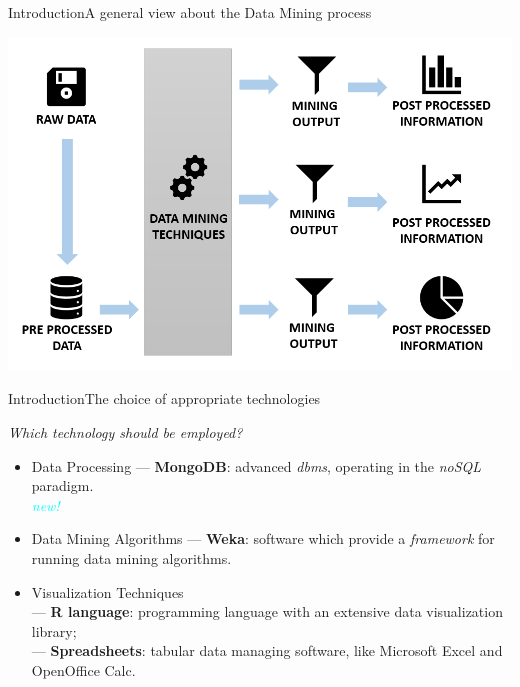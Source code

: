 \begin{frame}{Introduction}{A general view about the Data Mining process}
	\noindent\begin{centering}
		\vspace{-2mm}\hspace{-5mm}\includegraphics[scale=0.33]{img1_noback.png}
	\end{centering}
\end{frame}

\begin{frame}{Introduction}{The choice of appropriate technologies}

	\centering\textit{Which technology should be employed?} \vspace{0,3cm}

	\begin{block}{}
	    \begin{itemize}
		    \item<1-> \alert{Data Processing} --- \textbf{MongoDB}: advanced \emph{dbms}, operating in the \emph{noSQL} paradigm. \\ \hspace{0.8cm}\textcolor{cyan}{\emph{new!}}
		    \item<2-> \alert{Data Mining Algorithms} --- \textbf{Weka}: software which provide a \emph{framework} for running data mining algorithms.
			\item<3-> \alert{Visualization Techniques} \\
			--- \textbf{R language}: programming language with an extensive data visualization library; \\
			--- \textbf{Spreadsheets}: tabular data managing software, like Microsoft Excel and OpenOffice Calc.
	    \end{itemize}
    \end{block}

\end{frame}

